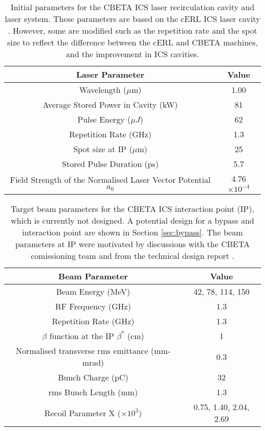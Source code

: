 \documentclass[11pt]{article}
\begin{document}
\begin{table}[H]
\centering
\begin{tabular}{|c||c|}
\hline
\textbf{Laser Parameter} & \textbf{Value} \\
\hline
Wavelength ($\mu$m) & 1.00 \\
\hline
Average Stored Power in Cavity (kW) & 81 \\
\hline
Pulse Energy ($\mu J$) & 62 \\
\hline
Repetition Rate (GHz) & 1.3 \\
\hline
Spot size at IP ($\mu$m) & 25 \\
\hline
Stored Pulse Duration (ps) & 5.7 \\
\hline
Field Strength of the Normalised Laser Vector Potential $a_{0}$ & 4.76$\times 10^{-4}$ \\
\hline 
\end{tabular}
\caption{\label{tab:CBETAlaser} Initial parameters for the CBETA ICS laser recirculation cavity and laser system. These parameters are based on the cERL ICS laser cavity \cite{TAkagicERL}. However, some are modified such as the repetition rate and the spot size to reflect the difference between the cERL and CBETA machines, and the improvement in ICS cavities.}
\end{table}

\begin{table}[H]
\centering
\begin{tabular}{|c||c|}
\hline
\textbf{Beam Parameter} & \textbf{Value} \\
\hline
Beam Energy (MeV) & 42, 78, 114, 150 \\
\hline
RF Frequency (GHz) & 1.3 \\
\hline
Repetition Rate (GHz) & 1.3 \\
\hline
$\beta$ function at the IP $\beta^{*}$ (cm) & 1 \\
\hline
Normalised transverse rms emittance (mm-mrad) & 0.3 \\
\hline
Bunch Charge (pC) & 32 \\
\hline
rms Bunch Length (mm) & 1.3 \\
\hline
Recoil Parameter X ($\times 10^{3}$) & 0.75, 1.40, 2.04, 2.69 \\
\hline
\end{tabular}
\caption{\label{tab:CBETAbeamIP} Target beam parameters for the CBETA ICS interaction point (IP), which is currently not designed. A potential design for a bypass and interaction point are shown in Section \ref{sec:bypass}. The beam parameters at IP were motivated by discussions with the CBETA comissioning team and from the technical design report \cite{CBETATDR}.}
\end{table}  
\end{document}
